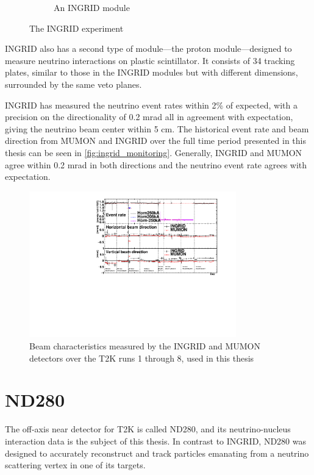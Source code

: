 \begin{figure}[h]
\begin{subfigure}[t]{0.47\textwidth}
		\caption{An INGRID module}
	\end{subfigure}
	\caption{The INGRID experiment}
	\label{fig:ingrid_det}
\end{figure}
INGRID also has a second type of module---the proton module\cite{t2k_ingrid_proton}---designed to measure neutrino interactions on plastic scintillator. It consists of 34 tracking plates, similar to those in the INGRID modules but with different dimensions, surrounded by the same veto planes.

INGRID has measured the neutrino event rates within 2\% of expected, with a precision on the directionality of 0.2 mrad all in agreement with expectation\cite{t2k_2015}, giving the neutrino beam center within 5 cm. The historical event rate and beam direction from MUMON and INGRID over the full time period presented in this thesis can be seen in \autoref{fig:ingrid_monitoring}. Generally, INGRID and MUMON agree within 0.2 mrad in both directions and the neutrino event rate agrees with expectation.
\begin{figure}[h]
	\includegraphics[width=0.8\textwidth, trim={0mm 0mm 0mm 0mm}, clip,page=1]{figures/det_chap/ingrid/INGRID_official_plot_until74}
	\caption{Beam characteristics measured by the INGRID and MUMON detectors over the T2K runs 1 through 8, used in this thesis}
	\label{fig:ingrid_monitoring}
\end{figure}

\section{ND280}
\label{sec:nd280}
The off-axis near detector for T2K is called ND280, and its neutrino-nucleus interaction data is the subject of this thesis. In contrast to INGRID, ND280 was designed to accurately reconstruct and track particles emanating from a neutrino scattering vertex in one of its targets. 

